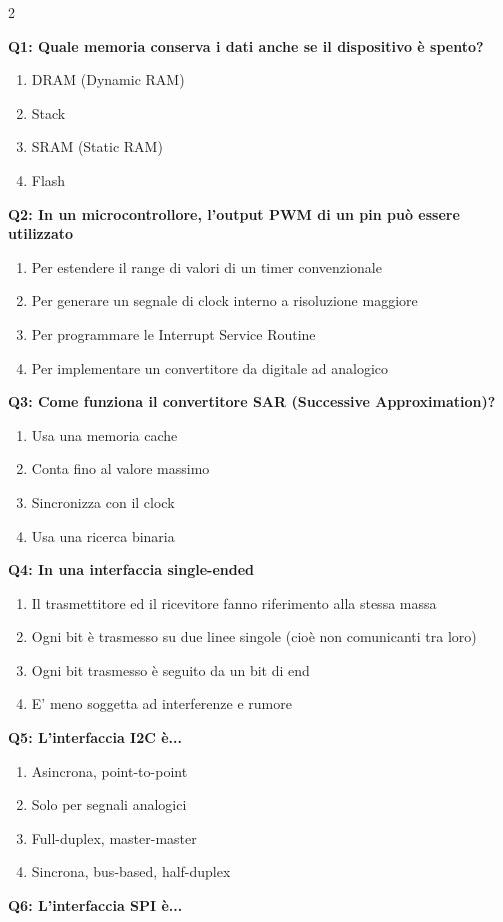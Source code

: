 \documentclass[10pt]{article}
\begin{document}
\begin{multicols}{2}

\textbf{Q1: Quale memoria conserva i dati anche se il dispositivo è spento?}

\begin{enumerate}[label=\arabic*.]
\item DRAM (Dynamic RAM)
\item Stack
\item SRAM (Static RAM)
\item Flash
\end{enumerate}
\textbf{Q2: In un microcontrollore, l'output PWM di un pin può essere utilizzato}

\begin{enumerate}[label=\arabic*.]
\item Per estendere il range di valori di un timer convenzionale
\item Per generare un segnale di clock interno a risoluzione maggiore
\item Per programmare le Interrupt Service Routine
\item Per implementare un convertitore da digitale ad analogico
\end{enumerate}
\textbf{Q3: Come funziona il convertitore SAR (Successive Approximation)?}

\begin{enumerate}[label=\arabic*.]
\item Usa una memoria cache
\item Conta fino al valore massimo
\item Sincronizza con il clock
\item Usa una ricerca binaria
\end{enumerate}
\textbf{Q4: In una interfaccia single-ended}

\begin{enumerate}[label=\arabic*.]
\item Il trasmettitore ed il ricevitore fanno riferimento alla stessa massa
\item Ogni bit è trasmesso su due linee singole (cioè non comunicanti tra loro)
\item Ogni bit trasmesso è seguito da un bit di end
\item E' meno soggetta ad interferenze e rumore
\end{enumerate}
\textbf{Q5: L’interfaccia I2C è...}

\begin{enumerate}[label=\arabic*.]
\item Asincrona, point-to-point
\item Solo per segnali analogici
\item Full-duplex, master-master
\item Sincrona, bus-based, half-duplex
\end{enumerate}
\textbf{Q6: L'interfaccia SPI è...}


\end{multicols}
\end{document}
